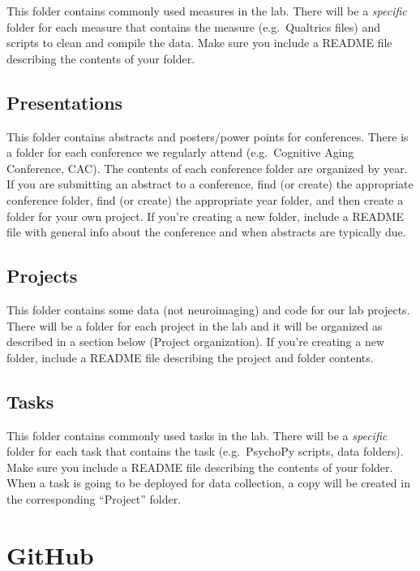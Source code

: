 \documentclass[]{book}
\begin{document}
This folder contains commonly used measures in the lab. There will be a \emph{specific} folder for each measure that contains the measure (e.g.~Qualtrics files) and scripts to clean and compile the data. Make sure you include a README file describing the contents of your folder.

\hypertarget{presentations}{%
\subsection{Presentations}\label{presentations}}

This folder contains abstracts and posters/power points for conferences. There is a folder for each conference we regularly attend (e.g.~Cognitive Aging Conference, CAC). The contents of each conference folder are organized by year. If you are submitting an abstract to a conference, find (or create) the appropriate conference folder, find (or create) the appropriate year folder, and then create a folder for your own project. If you're creating a new folder, include a README file with general info about the conference and when abstracts are typically due.

\hypertarget{projects}{%
\subsection{Projects}\label{projects}}

This folder contains some data (not neuroimaging) and code for our lab projects. There will be a folder for each project in the lab and it will be organized as described in a section below (Project organization). If you're creating a new folder, include a README file describing the project and folder contents.

\hypertarget{tasks}{%
\subsection{Tasks}\label{tasks}}

This folder contains commonly used tasks in the lab. There will be a \emph{specific} folder for each task that contains the task (e.g.~PsychoPy scripts, data folders). Make sure you include a README file describing the contents of your folder. When a task is going to be deployed for data collection, a copy will be created in the corresponding ``Project'' folder.

\hypertarget{github}{%
\section{GitHub}\label{github}}
\end{document}

